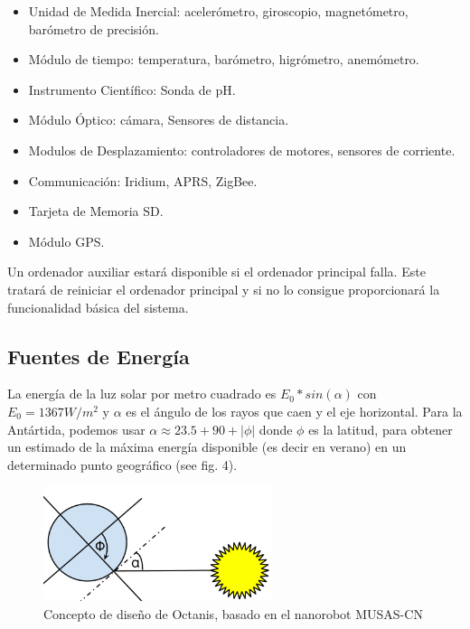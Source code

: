 \documentclass[a4paper,12pt]{article}
\begin{document}
\begin{itemize}
\item Unidad de Medida Inercial: acelerómetro, giroscopio, magnetómetro, barómetro de precisión.
\item Módulo de tiempo: temperatura, barómetro, higrómetro, anemómetro.
\item Instrumento Científico: Sonda de pH.
\item Módulo Óptico: cámara, Sensores de distancia.
\item Modulos de Desplazamiento: controladores de motores, sensores de corriente.
\item Communicación: Iridium, APRS, ZigBee.
\item Tarjeta de Memoria SD.
\item Módulo GPS.
\end{itemize}

Un ordenador auxiliar estará disponible si el ordenador principal falla. Este tratará de reiniciar el ordenador principal y si no lo consigue proporcionará la funcionalidad básica del sistema.



\subsection{Fuentes de Energía}

La energía de la luz solar por metro cuadrado es $E_0*sin(\alpha)$ con $E_0=1367 W/m^2$ \cite{solarc} y $\alpha$  es el ángulo de los rayos que caen y el eje horizontal. Para la Antártida, podemos usar $\alpha \approx 23.5+90+|\phi|$ donde $\phi$ es la latitud, para obtener un estimado de la máxima energía disponible (es decir en verano) en un determinado punto geográfico (see fig. 4).


\begin{figure}[h!]
	\centering
    \includegraphics[width=0.6\textwidth]{sun}
    \caption{Concepto de diseño de Octanis, basado en el nanorobot MUSAS-CN}
\end{figure}
\end{document}
